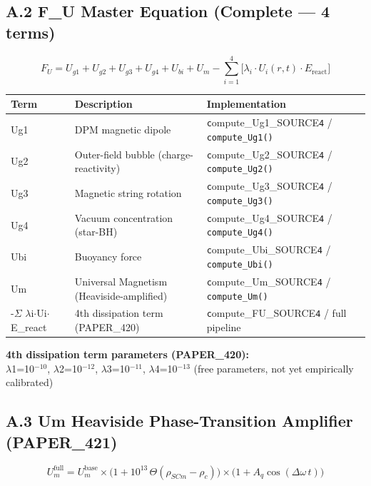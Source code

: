 \documentclass[12pt,a4paper]{article}
\begin{document}
\subsection{A.2 F\_U Master Equation (Complete --- 4 terms)}

\begin{equation}
F_U = U_{g1} + U_{g2} + U_{g3} + U_{g4} + U_{bi} + U_m - \sum_{i=1}^{4}\bigl[\lambda_i \cdot U_i(r,t) \cdot E_{\mathrm{react}}\bigr]
\end{equation}

\begin{table}[H]
\centering
\small
\begin{tabularx}{\linewidth}{@{}>{\raggedright\arraybackslash}X>{\raggedright\arraybackslash}X>{\raggedright\arraybackslash}X@{}}
\toprule
Term & Description & Implementation \tabularnewline
\midrule
Ug1 & DPM magnetic dipole & \texttt{c}ompute\_{Ug1\_SOURCE}\texttt{4} / \texttt{compute\_Ug1()} \tabularnewline
Ug2 & Outer-field bubble (charge-reactivity) & \texttt{c}ompute\_{Ug2\_SOURCE}\texttt{4} / \texttt{compute\_Ug2()} \tabularnewline
Ug3 & Magnetic string rotation & \texttt{c}ompute\_{Ug3\_SOURCE}\texttt{4} / \texttt{compute\_Ug3()} \tabularnewline
Ug4 & Vacuum concentration (star-BH) & \texttt{c}ompute\_{Ug4\_SOURCE}\texttt{4} / \texttt{compute\_Ug4()} \tabularnewline
Ubi & Buoyancy force & \texttt{c}ompute\_{Ubi\_SOURCE}\texttt{4} / \texttt{compute\_Ubi()} \tabularnewline
Um & Universal Magnetism (Heaviside-amplified) & \texttt{c}ompute\_{Um\_SOURCE}\texttt{4} / \texttt{compute\_Um()} \tabularnewline
-$\Sigma$ $\lambda$i$\cdot$Ui$\cdot$E\_react & 4th dissipation term (PAPER\_420) & \texttt{c}ompute\_{FU\_SOURCE}\texttt{4} / full pipeline \tabularnewline
\bottomrule
\end{tabularx}
\end{table}

\textbf{4th dissipation term parameters (PAPER\_420):} \\  $\lambda$1=10$^{-10}$, $\lambda$2=10$^{-12}$, $\lambda$3=10$^{-11}$, $\lambda$4=10$^{-13}$ (free parameters, not yet empirically calibrated)

\subsection{A.3 Um Heaviside Phase-Transition Amplifier (PAPER\_421)}

\begin{equation}
U_m^{\mathrm{full}} = U_m^{\mathrm{base}} \times \bigl(1 + 10^{13}\,\Theta(\rho_{SCm} - \rho_c)\bigr) \times \bigl(1 + A_q\cos(\Delta\omega\,t)\bigr)
\end{equation}
\end{document}
